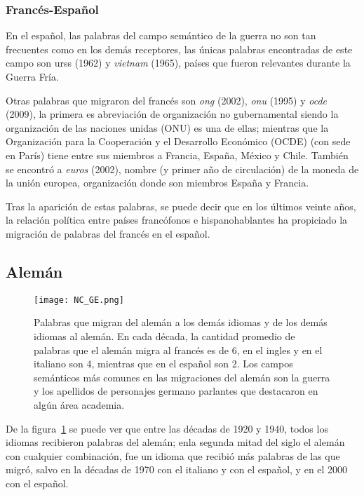 \subsubsection*{Francés-Español}%


En el español, las palabras del campo semántico de la guerra no son tan frecuentes como en los demás receptores, las únicas palabras encontradas  de este campo son {urss} (1962) y \textit{vietnam} (1965), países que  fueron relevantes durante la Guerra Fría. 

Otras palabras que migraron del francés son \textit{ong} (2002), \textit{onu} (1995) y  \textit{ocde} (2009),  la primera es abreviación de organización no gubernamental siendo la organización de las naciones unidas (ONU) es una de ellas; mientras que la  Organización para la Cooperación y el Desarrollo Económico (OCDE) (con sede en París) tiene entre sus miembros a Francia, España, México y Chile. También se encontró a  \textit{euros} (2002), nombre (y primer año de circulación) de la moneda  de la unión europea, organización donde son miembros España y Francia. 

Tras la aparición de estas palabras, se puede decir que en los últimos veinte años, la relación política entre países francófonos e hispanohablantes ha propiciado la migración de palabras del francés en el español. 

%




\subsection{Alemán}%

\begin{figure}[h!]
	\centering
	\texttt{[image: NC\_GE.png]}
	\caption{Palabras que migran del alemán a los demás idiomas y de los demás idiomas al alemán. En cada década, la cantidad promedio de palabras que el alemán migra al francés es de 6, en el ingles y en el italiano son 4, mientras que en el español son 2. Los campos semánticos más comunes en las migraciones del alemán son la guerra  y  los apellidos  de personajes germano parlantes que destacaron en algún área academia.}  
	\label{fig.NC_GE}
\end{figure}


De la figura~\ref{fig.NC_GE} se puede ver que entre las décadas de 1920 y 1940, todos los idiomas recibieron palabras  del alemán; enla segunda mitad del siglo el alemán con cualquier combinación, fue un idioma que recibió más palabras de las que migró, salvo en la décadas de 1970 con el italiano y con el español, y en el 2000 con el español. 

